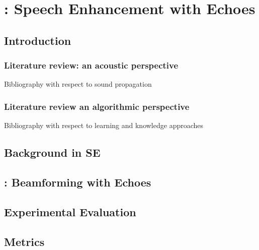 \chapter{\brioche: Speech Enhancement with Echoes}\label{ch:brioche}


\section{Introduction}

\subsection{Literature review: an acoustic perspective}
Bibliography with respect to sound propagation

\subsection{Literature review an algorithmic perspective}
Bibliography with respect to learning and knowledge approaches



\section{Background in SE}


\section{\brioche: Beamforming with Echoes}

\section{Experimental Evaluation}

\section{Metrics}


